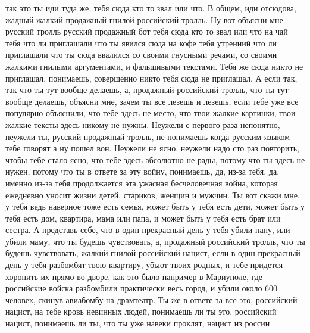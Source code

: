 так это ты иди туда же, тебя сюда кто то звал или что. В общем, иди отсюдова,
жадный жалкий продажный гнилой российский тролль. Ну вот объясни мне русский
тролль русский продажный бот тебя сюда кто то звал или что на чай тебя что ли
приглашали что ты явился сюда на кофе тебя утренний что ли приглашали что ты
сюда ввалился со своими гнусными речами, со своими жалкими гнилыми аргументами,
и фальшивыми текстами. Тебя же сюда никто не приглашал, понимаешь, совершенно
никто тебя сюда не приглашал. А если так, так что ты тут вообще делаешь, а,
продажный российский тролль, что ты тут вообще делаешь, объясни мне, зачем ты
все лезешь и лезешь, если тебе уже все популярно объяснили, что тебе здесь не
место, что твои жалкие картинки, твои жалкие тексты здесь никому не нужны.
Неужели с первого раза непонятно, неужели ты, русский продажный тролль, не
понимаешь когда русским языком тебе говорят а ну пошел вон. Неужели не ясно,
неужели надо сто раз повторить, чтобы тебе стало ясно, что тебе здесь абсолютно
не рады, потому что ты здесь не нужен, потому что ты в ответе за эту войну,
понимаешь, да, из-за тебя, да, именно из-за тебя продолжается эта ужасная
бесчеловечная война, которая ежедневно уносит жизни детей, стариков, женщин и
мужчин. Ты вот скажи мне, у тебя ведь наверное тоже есть семья, может быть у
тебя есть дети, может быть у тебя есть дом, квартира, мама или папа, и может
быть у тебя есть брат или сестра. А представь себе, что в один прекрасный день
у тебя убили папу, или убили маму, что ты будешь чувствовать, а, продажный
российский тролль, что ты будешь чувствовать, жалкий гнилой российский нацист,
если в один прекрасный день у тебя разбомбят твою квартиру, убьют твоих родных,
и тебе придется хоронить их прямо во дворе, как это было например в Мариуполе,
где российские войска разбомбили практически весь город, и убили около 600
человек, скинув авиабомбу на драмтеатр. Ты же в ответе за все это, российский
нацист, на тебе кровь невинных людей, понимаешь ли ты это, российский нацист,
понимаешь ли ты, что ты уже навеки проклят, нацист из россии


